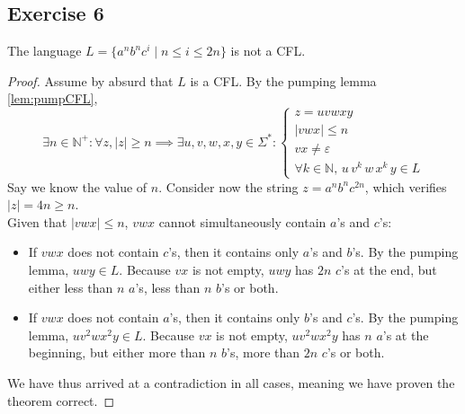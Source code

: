 {\subsection{Exercise 6}
\begin{theorem}
The language $L=\{a^nb^nc^i\mid n \leq i \leq 2n\}$ is not a CFL.
\end{theorem}
\begin{proof}
Assume by absurd that $L$ is a CFL. By the pumping lemma \eqref{lem:pumpCFL},
\begin{equation*}
	\exists n \in \mathbb{N}^+ \colon \forall z, |z|\geq n \implies \exists u, v, w, x, y \in \Sigma^* \colon 
	\begin{cases}
		z=uvwxy\\
		|vwx| \leq n\\
		vx \neq \varepsilon \\
		\forall k \in \mathbb{N},\,u\,v^k\,w\,x^k\,y \in L
	\end{cases}
\end{equation*}
Say we know the value of $n$. Consider now the string $z=a^nb^nc^{2n}$, which verifies $|z|=4n \geq n$. \\
Given that $|vwx|\leq n$, $vwx$ cannot simultaneously contain $a$'s and $c$'s:
\begin{itemize}
	\item If $vwx$ does not contain $c$'s, then it contains only $a$'s and $b$'s. By the pumping lemma, $uwy \in L$. Because $vx$ is not empty, $uwy$ has $2n$ $c$'s at the end, but either less than $n$ $a$'s, less than $n$ $b$'s or both.
	\item If $vwx$ does not contain $a$'s, then it contains only $b$'s and $c$'s. By the pumping lemma, $uv^2wx^2y \in L$. Because $vx$ is not empty, $uv^2wx^2y$ has $n$ $a$'s at the beginning, but either more than $n$ $b$'s, more than $2n$ $c$'s or both.
\end{itemize}
We have thus arrived at a contradiction in all cases, meaning we have proven the theorem correct.
\end{proof}
}
